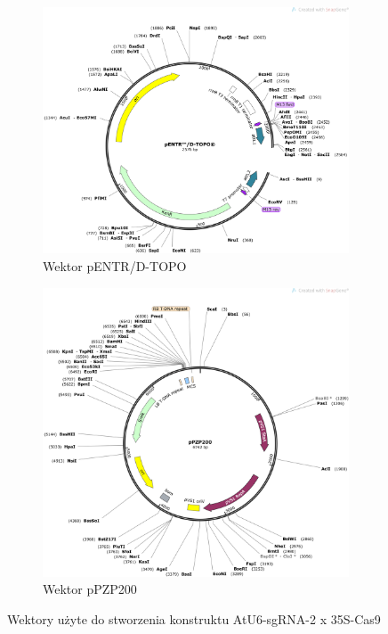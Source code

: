 \documentclass[two column, twoside, a4paper]{article}
\begin{document}
 \begin{figure}[bp]
	 \begin{tcolorbox}
		 \centering
		 \begin{subfigure}[b]{0.52\textwidth}
			 \includegraphics[width=\textwidth]{./figures/pENTR_D-TOPO.png}
		\caption{Wektor pENTR\texttrademark/D-TOPO}\label{fig::pENTR_D-TOPO}
		\end{subfigure}
		\hfill
		 \begin{subfigure}[b]{0.4375\textwidth}
			 \includegraphics[width=\textwidth]{./figures/pPZP200.png}
		\caption{Wektor pPZP200}\label{fig::pPZP200}
		\end{subfigure}
		 \caption{Wektory użyte do stworzenia konstruktu AtU6-sgRNA-2 x 35S-Cas9}\label{fig::vectors}
	\end{tcolorbox}
\end{figure}
\end{document}
